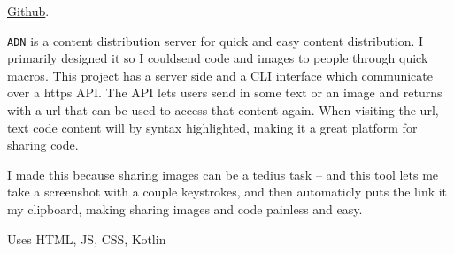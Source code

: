 \documentclass[10pt,letterpaper]{article}
\def\code#1{\texttt{#1}}
\begin{document}
    \href{https://github.com/mee42/adn}{Github}.
    
    \code{ADN} is a content distribution server for quick and easy content distribution.
    I primarily designed it so I couldsend code and images to people through quick macros.
    This project has a server side and a CLI interface which communicate over a https API.
    The API lets users send in some text or an image
    and returns with a url that can be used to access that content again.
    When visiting the url, text code content will by syntax highlighted,
    making it a great platform for sharing code.

    I made this because sharing images can be a tedius task -- 
    and this tool lets me take a screenshot with a couple keystrokes,
    and then automaticly puts the link it my clipboard,
    making sharing images and code painless and easy.

    \vspace{0.5em}
    \noindent Uses HTML, JS, CSS, Kotlin
\end{document}
